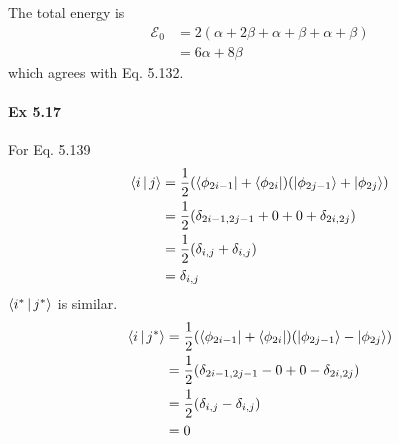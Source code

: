 \documentclass[a4paper]{article}
\newcommand{\ex}[1]{\paragraph{Ex #1}}
\numberwithin{equation}{subsection}
\begin{document}
The total energy is
\begin{align}
\mathscr{E}_0 &= 2(\alpha+2\beta + \alpha+\beta + \alpha+\beta)\\
&= 6\alpha + 8\beta
\end{align}
which agrees with Eq. 5.132.

\ex{5.17}
For Eq. 5.139
\begin{align}
\Braket{i|j} &= \dfrac{1}{2}\qty(\bra{\phi_{2i-1}} + \bra{\phi_{2i}}) \qty(\ket{\phi_{2j-1}} + \ket{\phi_{2j}}) \notag\\
&= \dfrac{1}{2}\qty(\delta_{2i-1,2j-1} + 0 + 0 + \delta_{2i,2j}) \notag\\
&= \dfrac{1}{2}\qty(\delta_{i,j} + \delta_{i,j}) \notag\\
&= \delta_{i,j}
\end{align}
$ \Braket{i^*|j^*} $ is similar.
\begin{align}
\Braket{i|j^*} &= \dfrac{1}{2}\qty(\bra{\phi_{2i-1}} + \bra{\phi_{2i}}) \qty(\ket{\phi_{2j-1}} - \ket{\phi_{2j}}) \notag\\
&= \dfrac{1}{2}\qty(\delta_{2i-1,2j-1} - 0 + 0 - \delta_{2i,2j}) \notag\\
&= \dfrac{1}{2}\qty(\delta_{i,j} - \delta_{i,j}) \notag\\
&= 0
\end{align}
\end{document}
